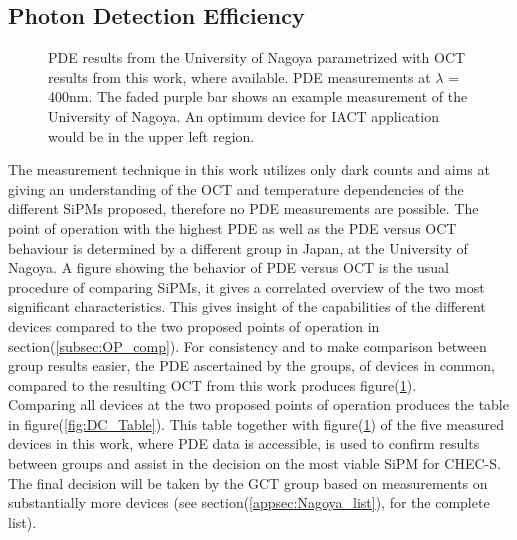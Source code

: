 \documentclass[12pt,article,type=msc,colorback,accentcolor=tud9c]{tudthesis}
\begin{document}
\subsection{Photon Detection Efficiency}
\begin{figure}[h!]
\begin{centering}
\caption[PDE versus OCT comparison]{PDE results from the University of Nagoya parametrized with OCT results from this work, where available. PDE measurements at $\lambda$ = 400nm. The faded purple bar shows an example measurement of the University of Nagoya. An optimum device for IACT application would be in the upper left region.}
\label{fig:Nagoya_PDE_me_OCT}
\end{centering}
\end{figure}
The measurement technique in this work utilizes only dark counts and aims at giving an understanding of the OCT and temperature dependencies of the different SiPMs proposed, therefore no PDE measurements are possible. The point of operation with the highest PDE as well as the PDE versus OCT behaviour is determined by a different group in Japan, at the University of Nagoya. A figure showing the behavior of PDE versus OCT is the usual procedure of comparing SiPMs, it gives a correlated overview of the two most significant characteristics. This gives insight of the capabilities of the different devices compared to the two proposed points of operation in section(\ref{subsec:OP_comp}). For consistency and to make comparison between group results easier, the PDE ascertained by the groups, of devices in common, compared to the resulting OCT from this work produces figure(\ref{fig:Nagoya_PDE_me_OCT}).\\
Comparing all devices at the two proposed points of operation produces the table in figure(\ref{fig:DC_Table}). This table together with figure(\ref{fig:Nagoya_PDE_me_OCT}) of the five measured devices in this work, where PDE data is accessible, is used to confirm results between groups and assist in the decision on the most viable SiPM for CHEC-S. The final decision will be taken by the GCT group based on measurements on substantially more devices (see section(\ref{appsec:Nagoya_list}), for the complete list).\\
\end{document}
